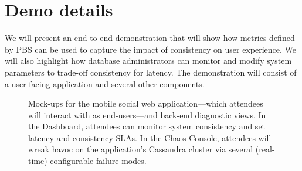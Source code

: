 \section{Demo details}
\label{sec:demo}


We will present an end-to-end demonstration that will show how metrics
defined by PBS can be used to capture the impact of consistency on
user experience. We will also highlight how database administrators
can monitor and modify system parameters to trade-off consistency for
latency. The demonstration will consist of a user-facing application and 
several other components.

\begin{figure}[tb]
\centering
\caption{Mock-ups for the mobile social web application---which
  attendees will interact with as end-users---and back-end diagnostic
  views. In the Dashboard, attendees can monitor system consistency
  and set latency and consistency SLAs. In the Chaos Console,
  attendees will wreak havoc on the application's Cassandra cluster
  via several (real-time) configurable failure modes.}
\label{fig:pbs-demo-screenshot}
\end{figure}





